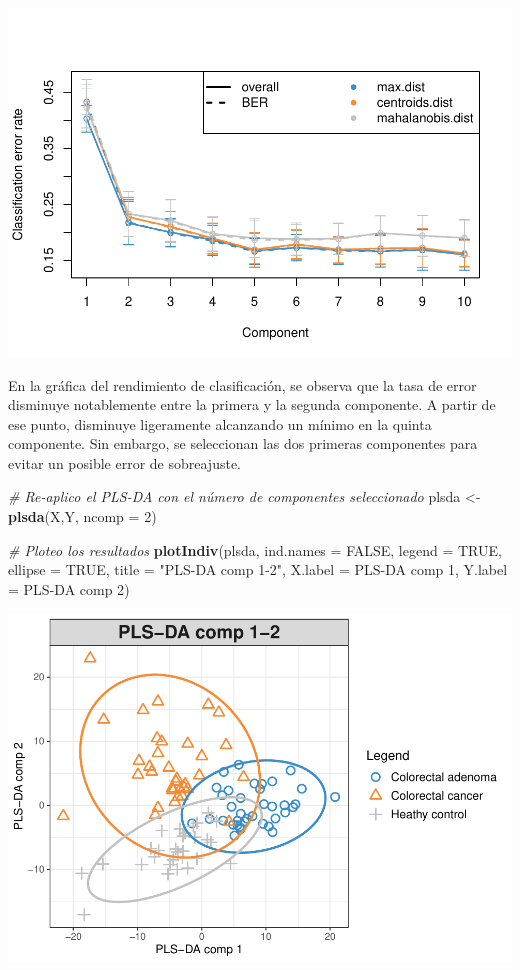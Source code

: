 \documentclass[
]{article}
\newenvironment{Shaded}{\begin{snugshade}}{\end{snugshade}}
\newcommand{\AttributeTok}[1]{\textcolor[rgb]{0.13,0.29,0.53}{#1}}
\newcommand{\CommentTok}[1]{\textcolor[rgb]{0.56,0.35,0.01}{\textit{#1}}}
\newcommand{\ConstantTok}[1]{\textcolor[rgb]{0.56,0.35,0.01}{#1}}
\newcommand{\DecValTok}[1]{\textcolor[rgb]{0.00,0.00,0.81}{#1}}
\newcommand{\FunctionTok}[1]{\textcolor[rgb]{0.13,0.29,0.53}{\textbf{#1}}}
\newcommand{\NormalTok}[1]{#1}
\newcommand{\OtherTok}[1]{\textcolor[rgb]{0.56,0.35,0.01}{#1}}
\newcommand{\StringTok}[1]{\textcolor[rgb]{0.31,0.60,0.02}{#1}}
\begin{document}
\begin{center}\includegraphics[width=0.7\linewidth]{Getino-Alvarez-Lidia-PEC1_files/figure-latex/PLS-DA ncomp selection-1} \end{center}

En la gráfica del rendimiento de clasificación, se observa que la tasa
de error disminuye notablemente entre la primera y la segunda
componente. A partir de ese punto, disminuye ligeramente alcanzando un
mínimo en la quinta componente. Sin embargo, se seleccionan las dos
primeras componentes para evitar un posible error de sobreajuste.

\begin{Shaded}
\begin{Highlighting}[]
\CommentTok{\# Re{-}aplico el PLS{-}DA con el número de componentes seleccionado}
\NormalTok{plsda }\OtherTok{\textless{}{-}} \FunctionTok{plsda}\NormalTok{(X,Y, }\AttributeTok{ncomp =} \DecValTok{2}\NormalTok{)}

\CommentTok{\# Ploteo los resultados}
\FunctionTok{plotIndiv}\NormalTok{(plsda,}
          \AttributeTok{ind.names =} \ConstantTok{FALSE}\NormalTok{,}
          \AttributeTok{legend =} \ConstantTok{TRUE}\NormalTok{,}
          \AttributeTok{ellipse =} \ConstantTok{TRUE}\NormalTok{, }
          \AttributeTok{title =} \StringTok{"PLS{-}DA comp 1{-}2"}\NormalTok{,}
          \AttributeTok{X.label =} \StringTok{\textquotesingle{}PLS{-}DA comp 1\textquotesingle{}}\NormalTok{, }\AttributeTok{Y.label =} \StringTok{\textquotesingle{}PLS{-}DA comp 2\textquotesingle{}}\NormalTok{)}
\end{Highlighting}
\end{Shaded}

\begin{center}\includegraphics[width=0.6\linewidth]{Getino-Alvarez-Lidia-PEC1_files/figure-latex/PLS-DA-1} \end{center}
\end{document}
